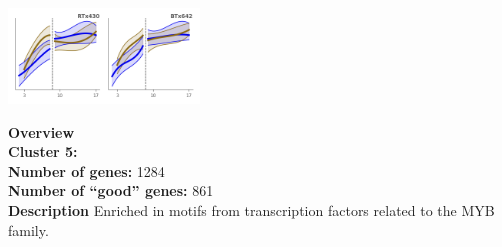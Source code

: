 \begin{multicols}{2}
\includegraphics[width=2in]{figures/clusters/root_Preflowering_4.png}
\columnbreak

\noindent \textbf{Overview}\\\textbf{Cluster 5:}  \\
\textbf{Number of genes:} 1284 \\
\textbf{Number of ``good'' genes:} 861 \\
\textbf{Description} Enriched in motifs from transcription factors related to the MYB family. \\
\end{multicols}

